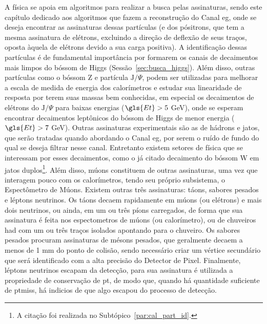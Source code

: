 A física se apoia em algoritmos
para realizar a busca pelas assinaturas, sendo este capítulo dedicado aos
algoritmos que fazem a reconstrução do Canal \gls{eg},
onde se deseja encontrar as assinaturas dessas partículas (e dos pósitrons, que
tem a mesma assinatura de elétrons, excluindo a direção de deflexão de seus
traços, oposta àquela de elétrons devido a sua carga positiva). A identificação
dessas partículas é de fundamental importância por formarem os canais de
decaimentos mais limpos do bóssom de Higgs (Sessão~\ref{sec:busca_higgs}). Além
disso, outras partículas como o bóssom Z e partícula $\text{J}/\Psi$, podem ser
utilizadas para melhorar a escala de medida de energia dos calorímetros e
estudar sua linearidade de resposta por terem suas massas bem conhecidas, 
em especial os decaimentos de elétrons do
$\text{J}/\Psi$ para baixas energias ($\gls{Et} > 5$ GeV), onde se esperam encontrar 
decaimentos leptônicos do bóssom de Higgs de menor energia ($\gls{Et} > 7$ GeV).
Outras assinaturas experimentais são as de hádrons e jatos, que serão tratadas
quando abordando o Canal \gls{eg}, por serem o ruído de fundo do qual se deseja
filtrar nesse canal. Entretanto existem setores de física que se
interessam por esses decaimentos, como o já citado decaimento do bóssom W em jatos
duplos\footnote{A citação foi realizada no Subtópico~\ref{par:cal_part_id}.}. 
Além disso, múons constituem de outras assinaturas, uma vez que interagem
pouco com os calorímetros, tendo seu próprio subsistema, o Espectômetro de
Múons. Existem outras três assinaturas:
táons, sabores pesados e léptons neutrinos. Os táons decaem
rapidamente em múons (ou elétrons) e mais dois neutrinos, ou ainda, em um ou três
píons carregados, de forma que sua assinatura é
feita nos espectometros de múons (ou calorímetro), ou de chuveiros \gls{had} com um ou três
traços isolados apontando para o chuveiro. Os sabores pesados procuram
assinaturas de mésons pesados, que geralmente decaem a menos de 1 mm do ponto de
colisão, sendo necessário criar um vértice secundário que será identificado com
a alta precisão do Detector de Pixel. Finalmente, léptons neutrinos escapam da
detecção, para sua assinatura é utilizada a propriedade de conservação de
\gls{pt}, de modo que, quando há quantidade suficiente de \gls{ptmiss}, há indicios
de que algo escapou do processo de detecção.

